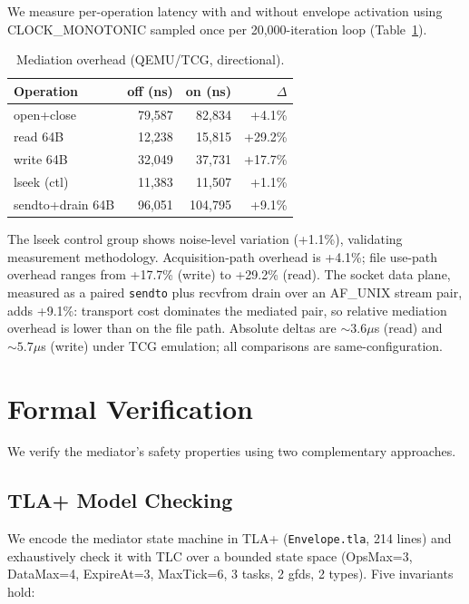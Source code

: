 \documentclass[letterpaper,twocolumn,10pt]{article}
\begin{document}
We measure per-operation latency with and without envelope activation
using CLOCK\_MONOTONIC sampled once per 20{,}000-iteration loop
(Table~\ref{tab:overhead}).

\begin{table}[t]
\centering
\caption{Mediation overhead (QEMU/TCG, directional).}
\label{tab:overhead}
\small
\begin{tabular}{lrrr}
\toprule
\textbf{Operation} & \textbf{off (ns)} & \textbf{on (ns)} & \textbf{$\Delta$} \\
\midrule
open+close & 79{,}587 & 82{,}834 & +4.1\% \\
read 64B   & 12{,}238 & 15{,}815 & +29.2\% \\
write 64B  & 32{,}049 & 37{,}731 & +17.7\% \\
lseek (ctl)& 11{,}383 & 11{,}507 & +1.1\% \\
sendto+drain 64B & 96{,}051 & 104{,}795 & +9.1\% \\
\bottomrule
\end{tabular}
\end{table}

The lseek control group shows noise-level variation (+1.1\%),
validating measurement methodology.  Acquisition-path overhead is
+4.1\%; file use-path overhead ranges from +17.7\% (write) to
+29.2\% (read).  The socket data plane, measured as a paired
\texttt{sendto} plus recvfrom drain over an AF\_UNIX stream pair,
adds +9.1\%: transport cost dominates the mediated pair, so relative
mediation overhead is lower than on the file path.  Absolute deltas
are ${\sim}3.6\mu$s (read) and ${\sim}5.7\mu$s (write) under TCG
emulation; all comparisons are same-configuration.

\section{Formal Verification}
\label{sec:formal}

We verify the mediator's safety properties using two complementary
approaches.

\subsection{TLA+ Model Checking}

We encode the mediator state machine in TLA+
(\texttt{Envelope.tla}, 214 lines) and exhaustively check it with TLC
over a bounded state space (OpsMax=3, DataMax=4, ExpireAt=3, MaxTick=6,
3 tasks, 2 gfds, 2 types).  Five invariants hold:
\end{document}
